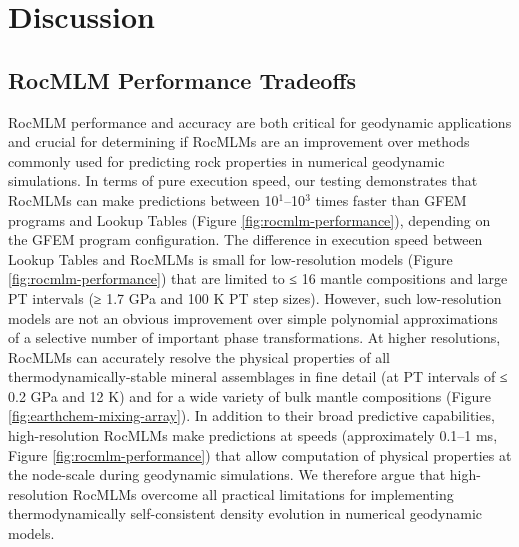 \documentclass[draft,linenumbers]{agujournal2018}
\begin{document}
\section{Discussion}\label{discussion}

\subsection{RocMLM Performance Tradeoffs}\label{sec:rocmlms-tradeoffs}

RocMLM performance and accuracy are both critical for geodynamic applications and crucial for determining if RocMLMs are an improvement over methods commonly used for predicting rock properties in numerical geodynamic simulations. In terms of pure execution speed, our testing demonstrates that RocMLMs can make predictions between 10\(^1\)--10\(^3\) times faster than GFEM programs and Lookup Tables (Figure \ref{fig:rocmlm-performance}), depending on the GFEM program configuration. The difference in execution speed between Lookup Tables and RocMLMs is small for low-resolution models (Figure \ref{fig:rocmlm-performance}) that are limited to ≤ 16 mantle compositions and large PT intervals (≥ 1.7 GPa and 100 K PT step sizes). However, such low-resolution models are not an obvious improvement over simple polynomial approximations of a selective number of important phase transformations. At higher resolutions, RocMLMs can accurately resolve the physical properties of all thermodynamically-stable mineral assemblages in fine detail (at PT intervals of ≤ 0.2 GPa and 12 K) and for a wide variety of bulk mantle compositions (Figure \ref{fig:earthchem-mixing-array}). In addition to their broad predictive capabilities, high-resolution RocMLMs make predictions at speeds (approximately 0.1--1 ms, Figure \ref{fig:rocmlm-performance}) that allow computation of physical properties at the node-scale during geodynamic simulations. We therefore argue that high-resolution RocMLMs overcome all practical limitations for implementing thermodynamically self-consistent density evolution in numerical geodynamic models.
\end{document}
